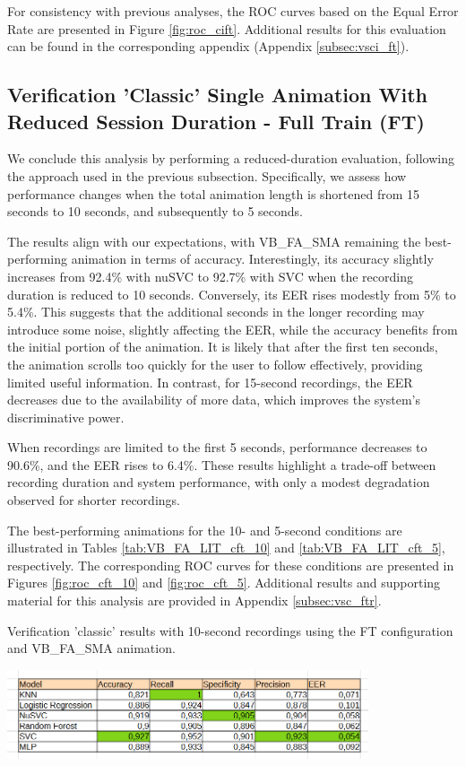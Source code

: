 \documentclass[12pt]{report}
\begin{document}
For consistency with previous analyses, the ROC curves based on the Equal Error Rate are presented in Figure \ref{fig:roc_cift}. 
Additional results for this evaluation can be found in the corresponding appendix (Appendix \ref{subsec:vsci_ft}).
\FloatBarrier

\subsection{Verification 'Classic' Single Animation With Reduced Session Duration - Full Train (FT)}

We conclude this analysis by performing a reduced-duration evaluation, following the approach used in the previous subsection. 
Specifically, we assess how performance changes when the total animation length is shortened from 15 seconds to 10 seconds, and subsequently to 5 seconds.

The results align with our expectations, with VB\_FA\_SMA remaining the best-performing animation in terms of accuracy. 
Interestingly, its accuracy slightly increases from 92.4\% with nuSVC to 92.7\% with SVC when the recording duration is reduced to 10 seconds. 
Conversely, its EER rises modestly from 5\% to 5.4\%. 
This suggests that the additional seconds in the longer recording may introduce some noise, slightly affecting the EER, while the accuracy benefits from the initial portion of the animation. 
It is likely that after the first ten seconds, the animation scrolls too quickly for the user to follow effectively, providing limited useful information. 
In contrast, for 15-second recordings, the EER decreases due to the availability of more data, which improves the system’s discriminative power.

When recordings are limited to the first 5 seconds, performance decreases to 90.6\%, and the EER rises to 6.4\%. 
These results highlight a trade-off between recording duration and system performance, with only a modest degradation observed for shorter recordings.

The best-performing animations for the 10- and 5-second conditions are illustrated in Tables \ref{tab:VB_FA_LIT_cft_10} and \ref{tab:VB_FA_LIT_cft_5}, respectively. 
The corresponding ROC curves for these conditions are presented in Figures \ref{fig:roc_cft_10} and \ref{fig:roc_cft_5}.
Additional results and supporting material for this analysis are provided in Appendix \ref{subsec:vsc_ftr}.

\begin{table}[ht]
    \centering
    \caption{Verification ’classic’ results with 10-second recordings using the FT configuration and VB\_FA\_SMA animation.}
    \includegraphics[width=0.8\textwidth]{Images/Results/Classic_procedure/five_ten/ft/ten/VB_FA_LIT.png}
    \label{tab:VB_FA_LIT_cft_10}
\end{table}
\end{document}
